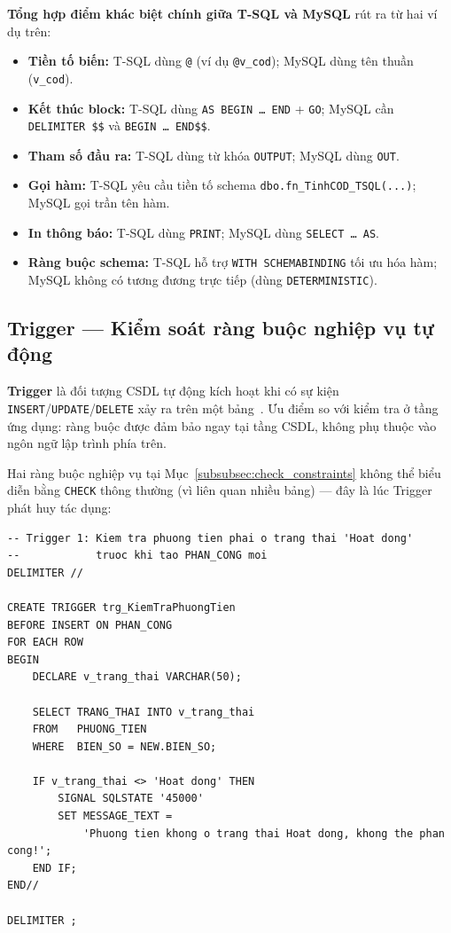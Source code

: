 \documentclass[11pt]{report}
\begin{document}
\textbf{Tổng hợp điểm khác biệt chính giữa T-SQL và MySQL} rút ra từ hai ví dụ trên:
\begin{itemize}
    \item \textbf{Tiền tố biến:} T-SQL dùng \texttt{@} (ví dụ \texttt{@v\_cod}); MySQL dùng tên thuần (\texttt{v\_cod}).
    \item \textbf{Kết thúc block:} T-SQL dùng \texttt{AS BEGIN \ldots{} END} + \texttt{GO}; MySQL cần \texttt{DELIMITER \$\$} và \texttt{BEGIN \ldots{} END\$\$}.
    \item \textbf{Tham số đầu ra:} T-SQL dùng từ khóa \texttt{OUTPUT}; MySQL dùng \texttt{OUT}.
    \item \textbf{Gọi hàm:} T-SQL yêu cầu tiền tố schema \texttt{dbo.fn\_TinhCOD\_TSQL(...)}; MySQL gọi trần tên hàm.
    \item \textbf{In thông báo:} T-SQL dùng \texttt{PRINT}; MySQL dùng \texttt{SELECT \ldots{} AS}.
    \item \textbf{Ràng buộc schema:} T-SQL hỗ trợ \texttt{WITH SCHEMABINDING} tối ưu hóa hàm; MySQL không có tương đương trực tiếp (dùng \texttt{DETERMINISTIC}).
\end{itemize}

\subsection{Trigger --- Kiểm soát ràng buộc nghiệp vụ tự động}
\label{subsec:trigger}

\textbf{Trigger} là đối tượng CSDL tự động kích hoạt khi có sự kiện \texttt{INSERT}/\texttt{UPDATE}/\texttt{DELETE} xảy ra trên một bảng~\cite{elmasri2015fundamentals}. Ưu điểm so với kiểm tra ở tầng ứng dụng: ràng buộc được đảm bảo ngay tại tầng CSDL, không phụ thuộc vào ngôn ngữ lập trình phía trên.

Hai ràng buộc nghiệp vụ tại Mục~\ref{subsubsec:check_constraints} không thể biểu diễn bằng \texttt{CHECK} thông thường (vì liên quan nhiều bảng) --- đây là lúc Trigger phát huy tác dụng:

\begin{verbatim}
-- Trigger 1: Kiem tra phuong tien phai o trang thai 'Hoat dong'
--            truoc khi tao PHAN_CONG moi
DELIMITER //

CREATE TRIGGER trg_KiemTraPhuongTien
BEFORE INSERT ON PHAN_CONG
FOR EACH ROW
BEGIN
    DECLARE v_trang_thai VARCHAR(50);

    SELECT TRANG_THAI INTO v_trang_thai
    FROM   PHUONG_TIEN
    WHERE  BIEN_SO = NEW.BIEN_SO;

    IF v_trang_thai <> 'Hoat dong' THEN
        SIGNAL SQLSTATE '45000'
        SET MESSAGE_TEXT =
            'Phuong tien khong o trang thai Hoat dong, khong the phan cong!';
    END IF;
END//

DELIMITER ;
\end{verbatim}
\end{document}
